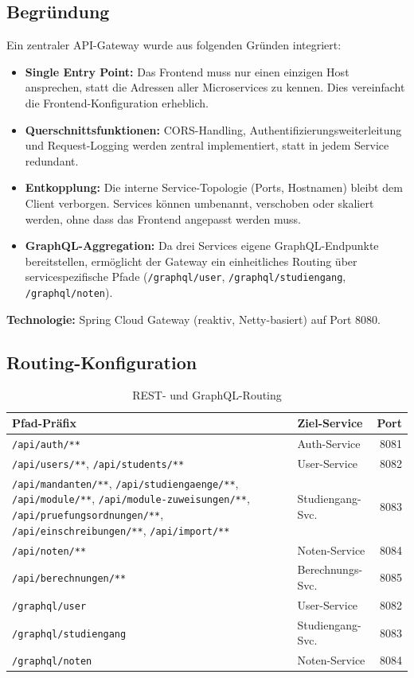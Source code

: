 \documentclass[12pt,a4paper,ngerman]{article}
\begin{document}
\subsection{Begründung}

Ein zentraler API-Gateway wurde aus folgenden Gründen integriert:

\begin{itemize}[nosep]
\item \textbf{Single Entry Point:} Das Frontend muss nur einen einzigen Host ansprechen, statt die Adressen aller Microservices zu kennen. Dies vereinfacht die Frontend-Konfiguration erheblich.
\item \textbf{Querschnittsfunktionen:} CORS-Handling, Authentifizierungsweiterleitung und Request-Logging werden zentral implementiert, statt in jedem Service redundant.
\item \textbf{Entkopplung:} Die interne Service-Topologie (Ports, Hostnamen) bleibt dem Client verborgen. Services können umbenannt, verschoben oder skaliert werden, ohne dass das Frontend angepasst werden muss.
\item \textbf{GraphQL-Aggregation:} Da drei Services eigene GraphQL-Endpunkte bereitstellen, ermöglicht der Gateway ein einheitliches Routing über servicespezifische Pfade (\texttt{/graphql/user}, \texttt{/graphql/studiengang}, \texttt{/graphql/noten}).
\end{itemize}

\textbf{Technologie:} Spring Cloud Gateway (reaktiv, Netty-basiert) auf Port 8080.

\subsection{Routing-Konfiguration}

\begin{table}[H]
\centering
\caption{REST- und GraphQL-Routing}
\begin{tabular}{L{5.5cm}lr}
\toprule
\textbf{Pfad-Präfix} & \textbf{Ziel-Service} & \textbf{Port} \\
\midrule
\texttt{/api/auth/**}               & Auth-Service        & 8081 \\
\texttt{/api/users/**}, \texttt{/api/students/**} & User-Service & 8082 \\
\texttt{/api/mandanten/**}, \texttt{/api/studiengaenge/**}, \texttt{/api/module/**}, \texttt{/api/module-zuweisungen/**}, \texttt{/api/pruefungsordnungen/**}, \texttt{/api/einschreibungen/**}, \texttt{/api/import/**} & Studiengang-Svc. & 8083 \\
\texttt{/api/noten/**}              & Noten-Service       & 8084 \\
\texttt{/api/berechnungen/**}       & Berechnungs-Svc.    & 8085 \\
\texttt{/graphql/user}              & User-Service        & 8082 \\
\texttt{/graphql/studiengang}       & Studiengang-Svc.    & 8083 \\
\texttt{/graphql/noten}             & Noten-Service       & 8084 \\
\bottomrule
\end{tabular}
\end{table}
\end{document}
